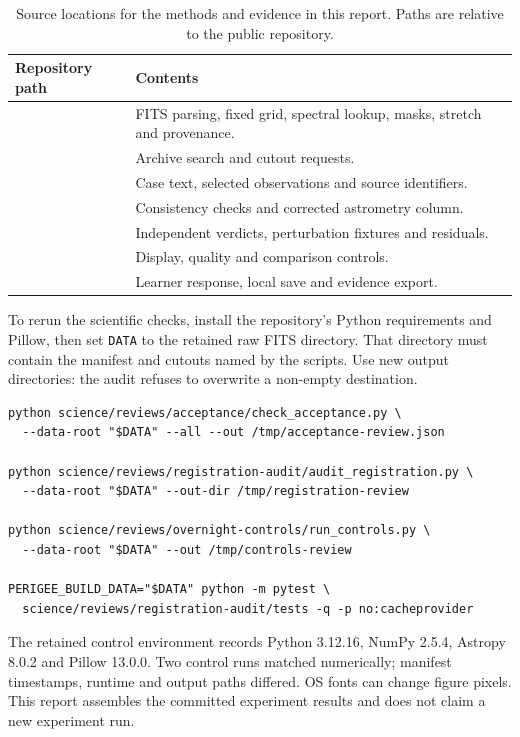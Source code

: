 \documentclass[11pt,letterpaper]{article}
\begin{document}
\begin{table}[htbp]
 \caption{Source locations for the methods and evidence in this report. Paths are relative to the public repository.}
 \label{tab:source}
 \small\centering
 \begin{tabularx}{\linewidth}{@{}L{.51\linewidth}X@{}}
 \toprule\textbf{Repository path}&\textbf{Contents}\\\midrule
 &FITS parsing, fixed grid, spectral lookup, masks, stretch and provenance.\\
 &Archive search and cutout requests.\\
 &Case text, selected observations and source identifiers.\\
 &Consistency checks and corrected astrometry column.\\
 &Independent verdicts, perturbation fixtures and residuals.\\
 &Display, quality and comparison controls.\\
 &Learner response, local save and evidence export.\\\bottomrule
 \end{tabularx}
\end{table}

To rerun the scientific checks, install the repository's Python requirements and Pillow, then set \texttt{DATA} to the retained raw FITS directory. That directory must contain the manifest and cutouts named by the scripts. Use new output directories: the audit refuses to overwrite a non-empty destination.

\begin{lstlisting}
python science/reviews/acceptance/check_acceptance.py \
  --data-root "$DATA" --all --out /tmp/acceptance-review.json

python science/reviews/registration-audit/audit_registration.py \
  --data-root "$DATA" --out-dir /tmp/registration-review

python science/reviews/overnight-controls/run_controls.py \
  --data-root "$DATA" --out /tmp/controls-review

PERIGEE_BUILD_DATA="$DATA" python -m pytest \
  science/reviews/registration-audit/tests -q -p no:cacheprovider
\end{lstlisting}

The retained control environment records Python 3.12.16, NumPy 2.5.4, Astropy 8.0.2 and Pillow 13.0.0. Two control runs matched numerically; manifest timestamps, runtime and output paths differed. OS fonts can change figure pixels. This report assembles the committed experiment results and does not claim a new experiment run.
\end{document}

